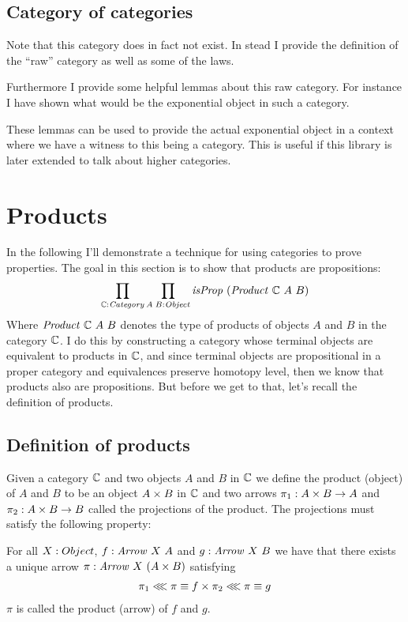 \subsection{Category of categories}
Note that this category does in fact not exist. In stead I provide the
definition of the ``raw'' category as well as some of the laws.

Furthermore I provide some helpful lemmas about this raw category. For instance
I have shown what would be the exponential object in such a category.

These lemmas can be used to provide the actual exponential object in a context
where we have a witness to this being a category. This is useful if this library
is later extended to talk about higher categories.

\section{Products}
\label{sec:products}
In the following I'll demonstrate a technique for using categories to prove
properties. The goal in this section is to show that products are propositions:
%
$$
\prod_{\bC \tp \Category} \prod_{A\;B \tp \Object} \isProp\ (\var{Product}\ \bC\ A\ B)
$$
%
Where $\mathit{Product}\ \mathbb{C}\ A\ B$ denotes the type of products of objects $A$
and $B$ in the category $\mathbb{C}$. I do this by constructing a category whose
terminal objects are equivalent to products in $\mathbb{C}$, and since terminal objects
are propositional in a proper category and equivalences preserve homotopy level,
then we know that products also are propositions. But before we get to that,
let's recall the definition of products.

\subsection{Definition of products}
Given a category $\mathbb{C}$ and two objects $A$ and $B$ in $\mathbb{C}$ we define the
product (object) of $A$ and $B$ to be an object $A \times B$ in $\mathbb{C}$ and two arrows
$\pi_1 \mathrel{:} A \times B \to A$ and $\pi_2 \mathrel{:} A \times B \to B$ called the projections of
the product. The projections must satisfy the following property:

For all $X \mathrel{:} Object$, $f \tp \Arrow\ X\ A$ and $g \tp \Arrow\ X\ B$ we have
that there exists a unique arrow $\pi \tp \Arrow\ X\ (A \x B)$ satisfying
%
\begin{align}
\label{eq:umpProduct}
\pi_1 \lll \pi \equiv f \times \pi_2 \lll \pi \equiv g
\end{align}
%
$\pi$ is called the product (arrow) of $f$ and $g$.

